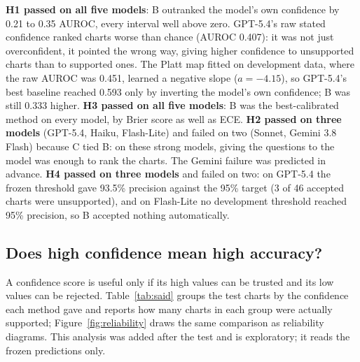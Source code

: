 \documentclass[10pt,letterpaper]{article}
\begin{document}
\textbf{H1 passed on all five models}: B outranked the model's own confidence by 0.21 to 0.35 AUROC, every interval well above zero. GPT-5.4's raw stated confidence ranked charts worse than chance (AUROC 0.407): it was not just overconfident, it pointed the wrong way, giving higher confidence to unsupported charts than to supported ones. The Platt map fitted on development data, where the raw AUROC was 0.451, learned a negative slope ($a=-4.15$), so GPT-5.4's best baseline reached 0.593 only by inverting the model's own confidence; B was still 0.333 higher.
\textbf{H3 passed on all five models}: B was the best-calibrated method on every model, by Brier score as well as ECE.
\textbf{H2 passed on three models} (GPT-5.4, Haiku, Flash-Lite) and failed on two (Sonnet, Gemini 3.8 Flash) because C tied B: on these strong models, giving the questions to the model was enough to rank the charts. The Gemini failure was predicted in advance.
\textbf{H4 passed on three models} and failed on two: on GPT-5.4 the frozen threshold gave 93.5\% precision against the 95\% target (3 of 46 accepted charts were unsupported), and on Flash-Lite no development threshold reached 95\% precision, so B accepted nothing automatically.

\FloatBarrier
\subsection{Does high confidence mean high accuracy?}\label{sec:results-calib}

A confidence score is useful only if its high values can be trusted and its low values can be rejected. Table~\ref{tab:said} groups the test charts by the confidence each method gave and reports how many charts in each group were actually supported; Figure~\ref{fig:reliability} draws the same comparison as reliability diagrams. This analysis was added after the test and is exploratory; it reads the frozen predictions only.
\end{document}
